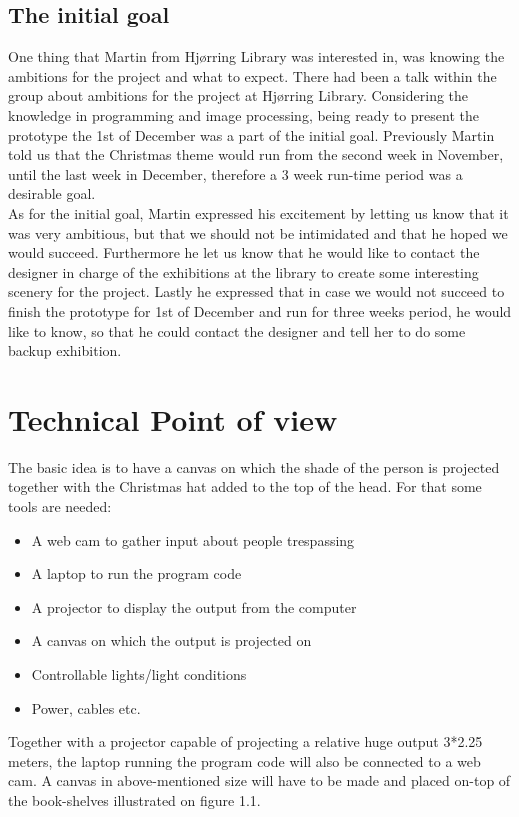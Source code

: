 \subsection{The initial goal}
One thing that Martin from Hjørring Library was interested in, was knowing the ambitions for the project and what to expect. There had been a talk within the group about ambitions for the project at Hjørring Library. Considering the knowledge in programming and image processing, being ready to present the prototype the 1st of December was a part of the initial goal. Previously Martin told us that the Christmas theme would run from the second week in November, until the last week in December, therefore a 3 week run-time period was a desirable goal.\\
As for the initial goal, Martin expressed his excitement by letting us know that it was very ambitious, but that we should not be intimidated and that he hoped we would succeed. Furthermore he let us know that he would like to contact the designer in charge of the exhibitions at the library to create some interesting scenery for the project. Lastly he expressed that in case we would not succeed to finish the prototype for 1st of December and run for three weeks period, he would like to know, so that he could contact the designer and tell her to do some backup exhibition.

\section{Technical Point of view}
The basic idea is to have a canvas on which the shade of the person is projected together with the Christmas hat added to the top of the head. For that some tools are needed:

\begin{itemize}
\item A web cam to gather input about people trespassing
\item A laptop to run the program code
\item A projector to display the output from the computer
\item A canvas on which the output is projected on
\item Controllable lights/light conditions
\item Power, cables etc.
\end{itemize}

Together with a projector capable of projecting a relative huge output 3*2.25 meters, the laptop running the program code will also be connected to a web cam. A canvas in above-mentioned size will have to be made and placed on-top of the book-shelves illustrated on figure 1.1.

